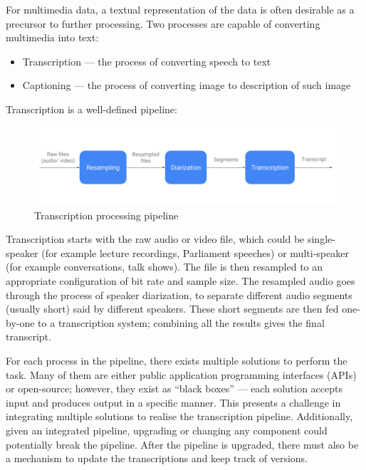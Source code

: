 For multimedia data, a textual representation of the data is often desirable
as a precursor to further processing. Two processes are capable of converting
multimedia into text:

\begin{itemize}
    \item Transcription --- the process of converting speech to
    text~\cite{transcribe-mw}
    \item Captioning --- the process of converting image to description
    of such image~\cite{caption}
\end{itemize}

Transcription is a well-defined pipeline:

\begin{figure}[h]
\begin{center}
    \includegraphics[width=\textwidth]{../images/pipeline_transcribe.png}
    \caption{Transcription processing pipeline}
\end{center}
\end{figure}

Transcription starts with the raw audio or video file, which could be
single-speaker (for example lecture recordings, Parliament speeches) or
multi-speaker (for example conversations, talk shows). The file is then resampled
to an appropriate configuration of bit rate and sample size. The resampled audio
goes through the process of speaker diarization, to separate different audio
segments (usually short) said by different speakers. These short segments are
then fed one-by-one to a transcription system; combining all the results gives
the final transcript.

For each process in the pipeline, there exists multiple solutions to perform
the task. Many of them are either public application programming interfaces (APIs)
or open-source; however, they exist as ``black boxes'' --- each solution accepts
input and produces output in a specific manner. This presents a challenge in
integrating multiple solutions to realise the transcription pipeline.
Additionally, given an integrated pipeline, upgrading or changing any component
could potentially break the pipeline. After the pipeline is upgraded, there must
also be a mechanism to update the transcriptions and keep track of versions. 

